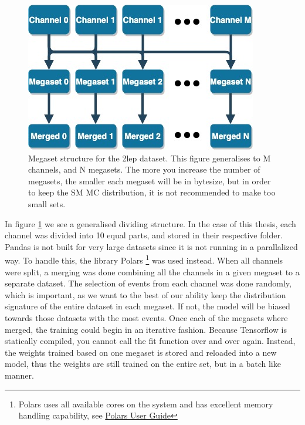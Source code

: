 \begin{figure}[H]
    \centering
    \includegraphics[width=0.6\linewidth]{Figures/2lep_config/megaset_struct.jpeg}
    \caption[Megaset structure diagram]{Megaset structure for the 2lep dataset. This figure generalises to M channels, and N megasets. The more you increase the number of megasets, 
    the smaller each megaset will be in bytesize, but in order to keep the SM MC distribution, it is not recommended to make too small sets.  }
    \label{fig:2lep_struct}
\end{figure}




In figure \ref{fig:2lep_struct} we see a generalised dividing structure. In the case of this thesis, each channel was divided into 10 equal parts, 
and stored in their respective folder. Pandas is not built for very large datasets since it is not running in a parallalized way. To handle this, the library
Polars
\footnote{Polars uses all available cores on the system and has excellent memory handling capability, see \href{https://pola-rs.github.io/polars-book/user-guide/}{Polars User Guide}}
\cite{ritchie_vink_2023_7744139} was used instead. When all channels were split, a merging was done combining all the channels in a given 
megaset to a separate dataset. The selection of events from each channel was done randomly, 
which is important, as we want to the best of our ability keep the distribution signature of the entire dataset in each megaset. If not, the model will 
be biased towards those datasets with the most events. Once each of the megasets where merged, the training could begin in an iterative fashion. Because
Tensorflow is statically compiled, you cannot call the fit function over and over again. Instead, the weights trained based on one megaset is stored and 
reloaded into a new model, thus the weights are still trained on the entire set, but in a batch like manner. 



